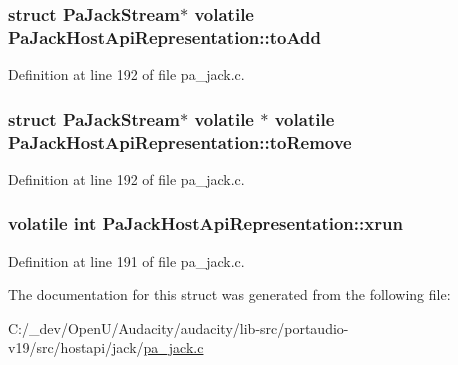 \subsubsection[{\texorpdfstring{to\+Add}{toAdd}}]{\setlength{\rightskip}{0pt plus 5cm}struct {\bf Pa\+Jack\+Stream}$\ast$ volatile Pa\+Jack\+Host\+Api\+Representation\+::to\+Add}\hypertarget{struct_pa_jack_host_api_representation_a17b82d1944981cbf6734327e86e6da44}{}\label{struct_pa_jack_host_api_representation_a17b82d1944981cbf6734327e86e6da44}


Definition at line 192 of file pa\+\_\+jack.\+c.

\subsubsection[{\texorpdfstring{to\+Remove}{toRemove}}]{\setlength{\rightskip}{0pt plus 5cm}struct {\bf Pa\+Jack\+Stream}$\ast$ volatile $\ast$ volatile Pa\+Jack\+Host\+Api\+Representation\+::to\+Remove}\hypertarget{struct_pa_jack_host_api_representation_a7512c18421ff64ed1e78efa05f4d9138}{}\label{struct_pa_jack_host_api_representation_a7512c18421ff64ed1e78efa05f4d9138}


Definition at line 192 of file pa\+\_\+jack.\+c.

\subsubsection[{\texorpdfstring{xrun}{xrun}}]{\setlength{\rightskip}{0pt plus 5cm}volatile {\bf int} Pa\+Jack\+Host\+Api\+Representation\+::xrun}\hypertarget{struct_pa_jack_host_api_representation_ace0bf7028cfbb7dc8d5965f95197b315}{}\label{struct_pa_jack_host_api_representation_ace0bf7028cfbb7dc8d5965f95197b315}


Definition at line 191 of file pa\+\_\+jack.\+c.



The documentation for this struct was generated from the following file\+:\begin{DoxyCompactItemize}
\item 
C\+:/\+\_\+dev/\+Open\+U/\+Audacity/audacity/lib-\/src/portaudio-\/v19/src/hostapi/jack/\hyperlink{pa__jack_8c}{pa\+\_\+jack.\+c}\end{DoxyCompactItemize}
